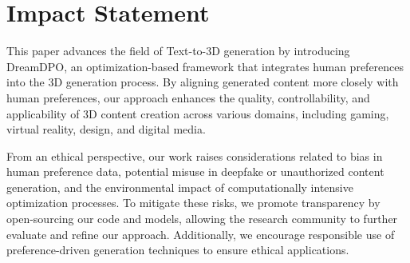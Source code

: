 \newpage
\section{Impact Statement}
This paper advances the field of Text-to-3D generation by introducing DreamDPO, an optimization-based framework that integrates human preferences into the 3D generation process. By aligning generated content more closely with human preferences, our approach enhances the quality, controllability, and applicability of 3D content creation across various domains, including gaming, virtual reality, design, and digital media.

From an ethical perspective, our work raises considerations related to bias in human preference data, potential misuse in deepfake or unauthorized content generation, and the environmental impact of computationally intensive optimization processes. To mitigate these risks, we promote transparency by open-sourcing our code and models, allowing the research community to further evaluate and refine our approach. Additionally, we encourage responsible use of preference-driven generation techniques to ensure ethical applications.